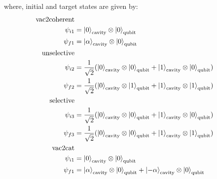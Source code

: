 \documentclass[12pt]{report}
\begin{document}
where, initial and target states are given by: 
\begin{align*}
    \text{vac2coherent} \\
    \psi_{i1} &= \ket{0}_{\text{cavity}} \otimes \ket{0}_{\text{qubit}} \\
    \psi_{f1} &= \ket{\alpha}_{\text{cavity}} \otimes \ket{0}_{\text{qubit}} \\
    \text{unselective} \\
    \psi_{i2} &= \frac{1}{\sqrt{2}} (\ket{0}_{\text{cavity}} \otimes \ket{0}_{\text{qubit}} 
                + \ket{1}_{\text{cavity}} \otimes \ket{0}_{\text{qubit}})\\
    \psi_{f2} &= \frac{1}{\sqrt{2}} (\ket{0}_{\text{cavity}} \otimes \ket{1}_{\text{qubit}} 
                + \ket{1}_{\text{cavity}} \otimes \ket{1}_{\text{qubit}})\\
    \text{selective} \\
    \psi_{i3} &= \frac{1}{\sqrt{2}} (\ket{0}_{\text{cavity}} \otimes \ket{0}_{\text{qubit}} 
                + \ket{1}_{\text{cavity}} \otimes \ket{0}_{\text{qubit}})\\
    \psi_{f3} &= \frac{1}{\sqrt{2}} (\ket{0}_{\text{cavity}} \otimes \ket{0}_{\text{qubit}} 
                + \ket{1}_{\text{cavity}} \otimes \ket{1}_{\text{qubit}})\\
    \text{vac2cat} \\
    \psi_{i1} &= \ket{0}_{\text{cavity}} \otimes \ket{0}_{\text{qubit}} \\
    \psi_{f1} &= \ket{\alpha}_{\text{cavity}} \otimes \ket{0}_{\text{qubit}} 
                + \ket{-\alpha}_{\text{cavity}} \otimes \ket{0}_{\text{qubit}} \\
\end{align*}
\end{document}
